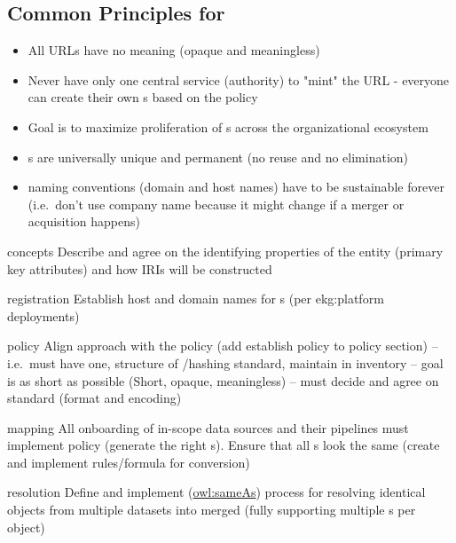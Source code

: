 \subsection*{Common Principles for }

\begin{itemize}
  \item All URLs have no meaning (opaque and meaningless)
  \item Never have only one central service (authority) to "mint" the URL - everyone can create their own
        s based on the policy
  \item Goal is to maximize proliferation of s across the organizational ecosystem
  \item {}s are universally unique and permanent (no reuse and no elimination)
  \item {} naming conventions (domain and host names) have to be sustainable forever
        (i.e.\ don't use company name because it might change if a merger or acquisition happens)
\end{itemize}

\kgmmscoringsection

\kgmmscoringlevelOne

\begin{scoring}

  \item [concepts] Describe and agree on the identifying properties of the entity (primary key
        attributes) and how IRIs will be constructed
  \item [registration] Establish host and domain names for s (per \gls{ekg:platform} deployments)
  \item [policy] Align approach with the  policy (add establish policy to policy section) --
        i.e.\ must have one, structure of /hashing standard, maintain in inventory --
        goal is as short as possible (Short, opaque, meaningless) --
        must decide and agree on standard (format and encoding)
  \item [mapping] All onboarding of in-scope data sources and their  pipelines must implement policy
        (generate the right s).
        Ensure that all s look the same (create and implement rules/formula for conversion)
  \item [resolution] Define and implement (\href{https://www.w3.org/TR/owl-ref/\#sameAs-def}{owl:sameAs}) process for
        resolving identical objects from multiple datasets into merged  (fully supporting
        multiple s per object)

\end{scoring}

